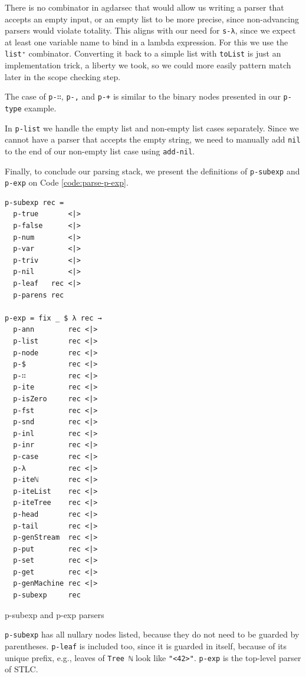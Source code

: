 There is no combinator in agdarsec that would allow us writing a parser that accepts an empty input, or an empty list to be more precise, since non-advancing parsers would violate totality. This aligns with our need for \verb$s-λ$, since we expect at least one variable name to bind in a lambda expression. For this we use the \verb$list⁺$ combinator. Converting it back to a simple list with \verb$toList$ is just an implementation trick, a liberty we took, so we could more easily pattern match later in the scope checking step.

The case of \verb$p-∷$, \verb$p-,$ and \verb$p-+$ is similar to the binary nodes presented in our \verb$p-type$ example.

In \verb$p-list$ we handle the empty list and non-empty list cases separately. Since we cannot have a parser that accepts the empty string, we need to manually add \verb$nil$ to the end of our non-empty list case using \verb$add-nil$.

Finally, to conclude our parsing stack, we present the definitions of \verb$p-subexp$ and \verb$p-exp$ on Code \ref{code:parse-p-exp}.

\begin{listing}[H]
\begin{verbatim}
p-subexp rec =
  p-true       <|>
  p-false      <|>
  p-num        <|>
  p-var        <|>
  p-triv       <|>
  p-nil        <|>
  p-leaf   rec <|>
  p-parens rec

p-exp = fix _ $ λ rec →
  p-ann        rec <|>
  p-list       rec <|>
  p-node       rec <|>
  p-$          rec <|>
  p-∷          rec <|>
  p-ite        rec <|>
  p-isZero     rec <|>
  p-fst        rec <|>
  p-snd        rec <|>
  p-inl        rec <|>
  p-inr        rec <|>
  p-case       rec <|>
  p-λ          rec <|>
  p-iteℕ       rec <|>
  p-iteList    rec <|>
  p-iteTree    rec <|>
  p-head       rec <|>
  p-tail       rec <|>
  p-genStream  rec <|>
  p-put        rec <|>
  p-set        rec <|>
  p-get        rec <|>
  p-genMachine rec <|>
  p-subexp     rec
\end{verbatim}
\caption{p-subexp and p-exp parsers}
\label{code:parse-p-exp}
\end{listing}

\verb$p-subexp$ has all nullary nodes listed, because they do not need to be guarded by parentheses. \verb$p-leaf$ is included too, since it is guarded in itself, because of its unique prefix, e.g., leaves of \verb$Tree ℕ$ look like \verb$"<42>"$. \verb$p-exp$ is the top-level parser of STLC.

